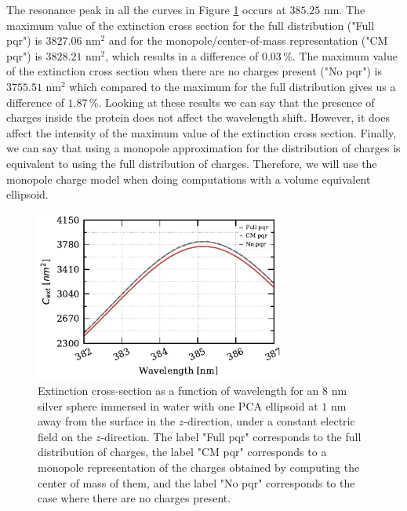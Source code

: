  The resonance peak in all the curves in Figure \ref{fig:pqr_pca} occurs at $385.25$ nm. The 
 maximum value of the extinction cross section for the full distribution ("Full pqr") is $3827.06$ nm$^2$ and for 
 the monopole/center-of-mass representation ("CM pqr") is $3828.21$ nm$^2$, which results in a difference of $0.03 \,\%$. The
 maximum value of the extinction cross section when there are no charges present ("No pqr") is $3755.51$ nm$^2$ which compared to 
 the maximum for the full distribution gives us a difference of $1.87 \,\%$. Looking at these results we can say that the presence of 
 charges inside the protein does not affect the wavelength shift. However, it does affect the intensity of the maximum value of the 
 extinction cross section. Finally, we can say that using a monopole approximation for the distribution of charges 
 is equivalent to using the full distribution of charges. Therefore, we will use the monopole charge model when doing computations with 
 a volume equivalent ellipsoid. 

\begin{figure}%
    \centering
    \includegraphics[width=0.75\textwidth]{pqr_analysis_pca.pdf} 
    \caption{Extinction cross-section as a function of wavelength for an $8$ nm
    silver sphere immersed in water with one PCA ellipsoid at $1$ nm away from 
    the surface in the $z$-direction, under a constant electric field on the $z$-direction.
    The label "Full pqr" corresponds to the full distribution of charges, the label "CM pqr" corresponds to a monopole representation 
    of the charges obtained by computing the center of mass of them, and the label "No pqr" 
    corresponds to the case where there are no charges present.}
    \label{fig:pqr_pca}
 \end{figure}



